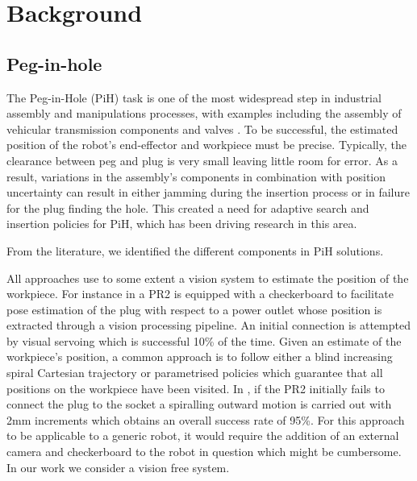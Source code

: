 \section{Background}\label{ch4:background}

\subsection{Peg-in-hole}

The Peg-in-Hole (PiH) task is one of the most widespread step in industrial assembly and manipulations processes, with 
examples including the assembly of vehicular transmission components \cite{search_strategies_icra_2001} and 
valves \cite{online_gpr_icra_2014}. To be successful, the estimated
position of the robot's end-effector and workpiece must be precise. Typically, the clearance between peg and plug 
is very small leaving little room for error. As a result, variations in the assembly's components 
in combination with position uncertainty can result in either jamming during the insertion process or in failure for 
the plug finding the hole. This created a need for adaptive search and insertion policies for PiH, which has been driving research 
in this area. 

From the literature, we identified the different components in PiH solutions. 

All approaches use to some extent a vision system to estimate the position of the workpiece. 
For instance in \cite{peg_personal_icra_2010} a PR2 is equipped with a checkerboard to facilitate pose 
estimation  of the plug with respect to a power outlet whose position is extracted through a vision 
processing pipeline. An initial connection is attempted by visual servoing which is successful 10\% of the 
time. Given an estimate of the workpiece's position, a common approach is to follow either a blind increasing spiral 
Cartesian trajectory or parametrised policies which guarantee that all positions on the workpiece have been visited.
In \cite{peg_personal_icra_2010}, if the PR2 initially fails to connect the plug to the socket
a spiralling outward motion is carried out with 2mm increments which obtains an overall 
success rate of 95\%. For this approach to be applicable to a generic robot, it would require the addition of an
external camera and checkerboard to the robot in question which might be cumbersome. In our work we consider a 
vision free system.


